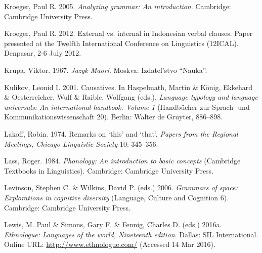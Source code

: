 \begin{styleCitaviBibliographyEntry}
Kroeger, Paul R. 2005. \textit{Analyzing grammar: An introduction}. Cambridge: Cambridge University Press.
\end{styleCitaviBibliographyEntry}

\begin{styleCitaviBibliographyEntry}
Kroeger, Paul R. 2012. External vs. internal  in Indonesian verbal clauses. Paper presented at the Twelfth International Conference on  Linguistics (12ICAL). Denpasar, 2-6 July 2012.
\end{styleCitaviBibliographyEntry}

\begin{styleCitaviBibliographyEntry}
Krupa, Viktor. 1967. \textit{Jazyk Maori}. Moskva: Izdatel’stvo “Nauka”.
\end{styleCitaviBibliographyEntry}

\begin{styleCitaviBibliographyEntry}
Kulikov, Leonid I. 2001. Causatives. In Haspelmath, Martin \& König, Ekkehard \& Oesterreicher, Wulf \& Raible, Wolfgang (eds.), \textit{Language typology and language universals: An international handbook. Volume 1} (Handbücher zur Sprach- und Kommunikationswissenschaft 20). Berlin: Walter de Gruyter, 886–898.
\end{styleCitaviBibliographyEntry}

\begin{styleCitaviBibliographyEntry}
Lakoff, Robin. 1974. Remarks on ‘this’ and ‘that’. \textit{Papers from the Regional Meetings, Chicago Linguistic Society} 10: 345–356.
\end{styleCitaviBibliographyEntry}

\begin{styleCitaviBibliographyEntry}
Lass, Roger. 1984. \textit{Phonology: An introduction to basic concepts} (Cambridge Textbooks in Linguistics). Cambridge: Cambridge University Press.
\end{styleCitaviBibliographyEntry}

\begin{styleCitaviBibliographyEntry}
Levinson, Stephen C. \& Wilkins, David P. (eds.) 2006. \textit{Grammars of space: Explorations in cognitive diversity} (Language, Culture and Cognition 6). Cambridge: Cambridge University Press.
\end{styleCitaviBibliographyEntry}

\begin{styleCitaviBibliographyEntry}
Lewis, M. Paul \& Simons, Gary F. \& Fennig, Charles D. (eds.) 2016a. \textit{Ethnologue: Languages of the world, Nineteenth edition}. Dallas: SIL International. Online URL: \url{http://www.ethnologue.com/} (Accessed 14 Mar 2016).
\end{styleCitaviBibliographyEntry}


